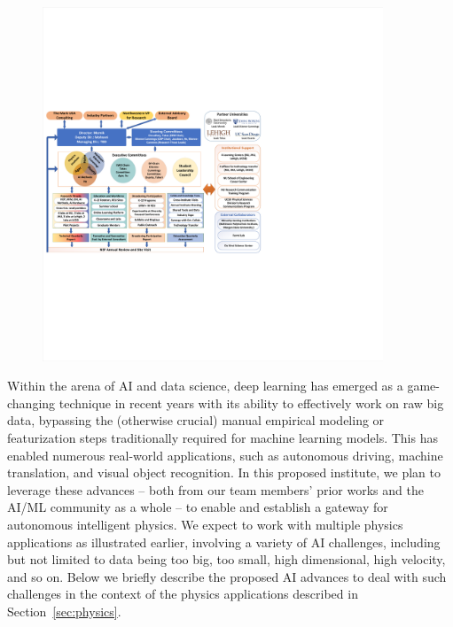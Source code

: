 

\begin{figure}
\centering
{ \includegraphics[width=4in,page=2,
trim={11.7cm 0.1cm 27cm 0.1cm},clip
]{diag/2020_NSF_Seda.pdf}}
    \caption{}
 \vskip-10pt    
    \label{fig:managementPlan}
\end{figure} 
Within the arena of AI and data science, deep learning has emerged as a game-changing technique in recent years with its ability to effectively work on raw big data, bypassing the (otherwise crucial) manual empirical modeling or featurization steps traditionally required for machine learning models. This has enabled numerous real-world applications, such as autonomous driving, machine translation, and visual object recognition. In this proposed institute, we plan to leverage these advances -- both from our team members' prior works and the AI/ML community as a whole -- to enable and establish a gateway for autonomous intelligent physics. We expect to work with multiple physics applications as illustrated earlier, involving a variety of AI challenges, including but not limited to data being too big, too small, high dimensional, high velocity, and so on. Below we briefly describe the proposed AI advances to deal with such challenges in the context of the physics applications described in Section~\ref{sec:physics}. 

